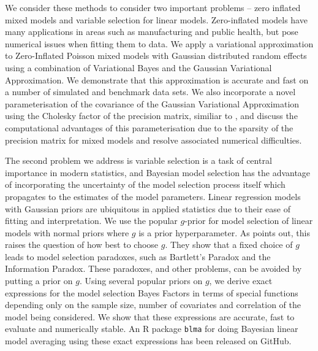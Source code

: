 \documentclass[PhD,stats]{usydthesis}[12pt]
\begin{document}
We consider these methods to consider two important problems -- zero inflated mixed models and variable
selection for linear models. Zero-inflated models have many applications in areas such as manufacturing and
public health, but pose numerical issues when fitting them to data. We apply a variational approximation to
Zero-Inflated Poisson mixed models with Gaussian distributed random effects using a combination of Variational
Bayes and the Gaussian Variational Approximation. We demonstrate that this approximation is accurate and fast
on a number of simulated and benchmark data sets. We also incorporate a novel parameterisation of the
covariance of the Gaussian Variational Approximation using the Cholesky factor of the precision matrix,
similiar to \cite{Tan2016}, and discuss the computational advantages of this parameterisation due to the
sparsity of the precision matrix for mixed models and resolve associated numerical difficulties.

The second problem we address is variable selection is a task of central importance in modern statistics, and
Bayesian model selection has the advantage of incorporating the uncertainty of the model selection process
itself which propagates to the estimates of the model  parameters. Linear regression models with Gaussian
priors are ubiquitous in applied statistics due to their ease of fitting and interpretation. We use the
popular $g$-prior \cite{Zellner1986} for model selection of linear models with normal priors where $g$ is a
prior hyperparameter. As \cite{Liang2008} points out, this raises the question of how best to choose $g$. They
show that a fixed choice of $g$ leads to model selection paradoxes, such as Bartlett's Paradox and the
Information Paradox. These paradoxes, and other problems, can be avoided by putting a prior on $g$. Using
several popular priors on $g$, we derive exact expressions for the model selection Bayes Factors in terms of
special functions depending only on  the sample size, number of covariates and correlation of the model being
considered. We show that these expressions are accurate, fast to evaluate and numerically stable. An R package
\texttt{blma} for doing Bayesian linear model averaging using these exact expressions has been  released on
GitHub.
\end{document}
